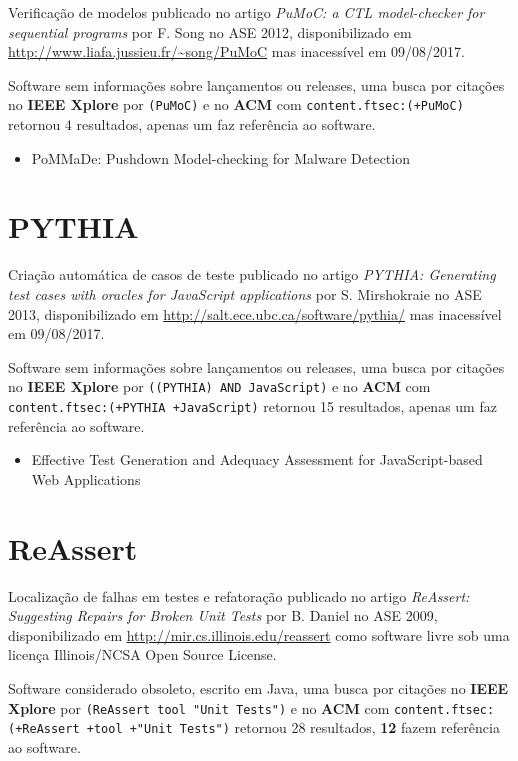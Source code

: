 Verificação de modelos
publicado no artigo {\it PuMoC: a CTL model-checker for sequential programs}
por F. Song
no ASE 2012,
disponibilizado em \url{http://www.liafa.jussieu.fr/~song/PuMoC}
mas inacessível em 09/08/2017.

Software sem informações sobre lançamentos ou releases,
uma busca por citações no {\bf IEEE Xplore} por
\texttt{(PuMoC)}
e no {\bf ACM} com
\texttt{content.ftsec:(+PuMoC)}
retornou
4 resultados,
apenas um faz referência ao software.

\begin{itemize}
\item PoMMaDe: Pushdown Model-checking for Malware Detection
\end{itemize}


\section{PYTHIA}

Criação automática de casos de teste
publicado no artigo {\it PYTHIA: Generating test cases with oracles for JavaScript applications}
por S. Mirshokraie
no ASE 2013,
disponibilizado em \url{http://salt.ece.ubc.ca/software/pythia/}
mas inacessível em 09/08/2017.

Software sem informações sobre lançamentos ou releases,
uma busca por citações no {\bf IEEE Xplore} por
\texttt{((PYTHIA) AND JavaScript)}
e no {\bf ACM} com
\texttt{content.ftsec:(+PYTHIA +JavaScript)}
retornou
15 resultados,
apenas um faz referência ao software.

\begin{itemize}
\item Effective Test Generation and Adequacy Assessment for JavaScript-based Web Applications
\end{itemize}


\section{ReAssert}

Localização de falhas em testes e refatoração
publicado no artigo {\it ReAssert: Suggesting Repairs for Broken Unit Tests}
por B. Daniel
no ASE 2009,
disponibilizado em \url{http://mir.cs.illinois.edu/reassert}
como software livre
sob uma licença Illinois/NCSA Open Source License.

Software considerado obsoleto,
escrito em Java,
uma busca por citações no {\bf IEEE Xplore} por
\texttt{(ReAssert tool "Unit Tests")}
e no {\bf ACM} com
\texttt{content.ftsec:(+ReAssert +tool +"Unit Tests")}
retornou
28 resultados,
{\bf 12} fazem referência ao software.

